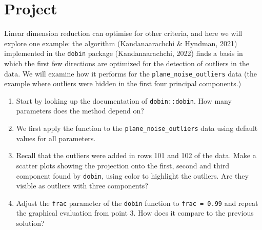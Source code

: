 \documentclass[
  letterpaper,
]{krantz}
\newenvironment{Shaded}{\begin{snugshade}}{\end{snugshade}}
\newcommand{\AttributeTok}[1]{\textcolor[rgb]{0.40,0.45,0.13}{#1}}
\newcommand{\DecValTok}[1]{\textcolor[rgb]{0.68,0.00,0.00}{#1}}
\newcommand{\FunctionTok}[1]{\textcolor[rgb]{0.28,0.35,0.67}{#1}}
\newcommand{\NormalTok}[1]{\textcolor[rgb]{0.00,0.23,0.31}{#1}}
\newcommand{\OtherTok}[1]{\textcolor[rgb]{0.00,0.23,0.31}{#1}}
\newcommand{\SpecialCharTok}[1]{\textcolor[rgb]{0.37,0.37,0.37}{#1}}
\providecommand{\tightlist}{%
  \setlength{\itemsep}{0pt}\setlength{\parskip}{0pt}}\usepackage{longtable,booktabs,array}
\begin{document}
\begin{Shaded}
\end{Shaded}

\section*{Project}\label{project-1}


Linear dimension reduction can optimise for other criteria, and here we
will explore one example: the algorithm (Kandanaarachchi \& Hyndman,
2021) implemented in the \texttt{dobin} package (Kandanaarachchi, 2022)
finds a basis in which the first few directions are optimized for the
detection of outliers in the data. We will examine how it performs for
the \texttt{plane\_noise\_outliers} data (the example where outliers
were hidden in the first four principal components.)

\begin{enumerate}
\def\labelenumi{\arabic{enumi}.}
\tightlist
\item
  Start by looking up the documentation of \texttt{dobin::dobin}. How
  many parameters does the method depend on?
\item
  We first apply the function to the \texttt{plane\_noise\_outliers}
  data using default values for all parameters.
\item
  Recall that the outliers were added in rows 101 and 102 of the data.
  Make a scatter plots showing the projection onto the first, second and
  third component found by \texttt{dobin}, using color to highlight the
  outliers. Are they visible as outliers with three components?
\item
  Adjust the \texttt{frac} parameter of the \texttt{dobin} function to
  \texttt{frac\ =\ 0.99} and repeat the graphical evaluation from point
  3. How does it compare to the previous solution?
\end{enumerate}
\end{document}

